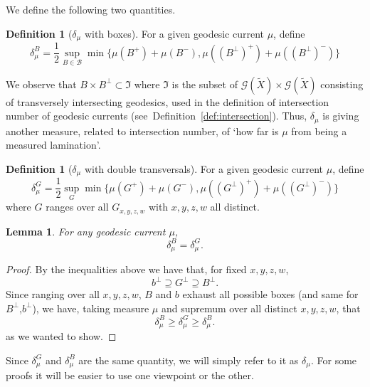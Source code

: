 \documentclass[12pt,article]{amsart}
\newcommand*{\svgfig}[1]{\Huge{}}
\numberwithin{equation}{section}
\numberwithin{figure}{section}
\newtheorem{lemma}[equation]{Lemma}
\theoremstyle{definition}
\newtheorem{definition}[equation]{Definition}
\theoremstyle{plain}
\newcommand\B{\ensuremath{\mathcal{B}}}
\newcommand*{\wt}[1]{\widetilde{#1}}
\begin{document}
We define the following two quantities.

\begin{definition}[$\delta_{\mu}$ with boxes]
For a given geodesic current $\mu$, define
\[
\delta^B_{\mu} =\frac{1}{2}\sup_{B  \in \B }\min \{ \mu(B^+) + \mu(B^-) , \mu((B^{\perp})^+) +  \mu((B^{\perp})^-)\}
\]
\label{lem:deltaB}
\end{definition}

We observe that $B \times B^{\perp} \subset \mathfrak{I}$ where $\mathfrak{I}$ is the subset of $\mathcal{G}(\wt{X}) \times  \mathcal{G}(\wt{X})$ consisting of transversely intersecting geodesics, used in the definition of intersection number of geodesic currents (see~Definition~\ref{def:intersection}).
Thus, $\delta_{\mu}$ is giving another measure, related to intersection number, of `how far is $\mu$ from being a measured lamination'.

\begin{definition}[$\delta_{\mu}$ with double transversals]
For a given geodesic current $\mu$, define
\[
\delta^G_{\mu} =\frac{1}{2} \sup_{G }\min \{ \mu(G^+) + \mu(G^-), \mu((G^{\perp})^+) + \mu((G^{\perp})^-) \}
\]
where $G$ ranges over all $G_{x,y,z,w}$ with $x,y,z,w$ all distinct. 
\label{lem:deltaG}
\end{definition}

\begin{lemma}
For any geodesic current $\mu$,
\[
\delta_{\mu}^B=\delta_{\mu}^G.
\]
\label{lem:equal_deltas}
\end{lemma}
\begin{proof}
By the inequalities above we have that, for fixed $x,y,z,w$,
\[
b^{\perp} \supseteq G^{\perp} \supseteq B^{\perp}.
\]
Since ranging over all $x,y,z,w$, $B$ and $b$ exhaust all possible boxes (and same for $B^{\perp}$,$b^{\perp}$), we have, taking measure $\mu$ and supremum over all distinct $x,y,z,w$,
that
\[
\delta_{\mu} ^B\geq \delta_{\mu}^G \geq\delta_{\mu}^B.
\]
as we wanted to show.
\end{proof}



    \begin{figure}[h!]
\centering{
\resizebox{130mm}{!}{\svgfig{opposite}}
    \caption{ }\label{fig:opposite}
}
\end{figure}

Since $\delta^G_{\mu}$ and  $\delta^B_{\mu}$ are the same quantity, we will simply refer to it as $\delta_{\mu}$. For some proofs it will be easier to use one viewpoint or the other.
\end{document}
